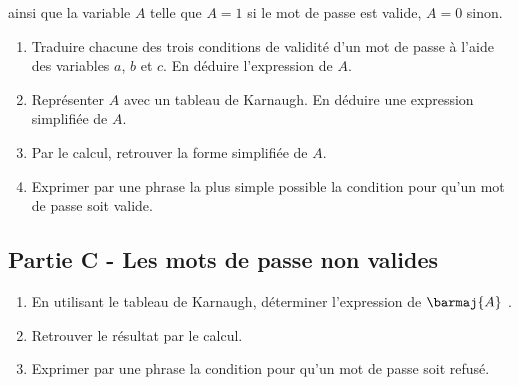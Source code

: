 \documentclass[a4paper,12pt]{article}
\begin{document}
ainsi que la variable $A$ telle que $A = 1$ si le mot de passe est valide, $A = 0$ sinon.

\begin{enumerate}[\bfseries 1.]
    \item 	Traduire chacune des trois conditions de validité d'un mot de passe à l'aide des
    variables $a$, $b$ et $c$. En déduire l'expression de $A$.
   \item 	Représenter $A$ avec un tableau de Karnaugh. En déduire une expression simplifiée
   de $A$.
   \item Par le calcul, retrouver la forme simplifiée de $A$.
   \item Exprimer par une phrase la plus simple possible la condition pour qu'un mot de passe soit valide.
\end{enumerate}
\subsection*{Partie C - Les mots de passe non valides}

\begin{enumerate}[\bfseries 1.]
    \item 	En utilisant le tableau de Karnaugh, déterminer l'expression de $\barmaj{A}$ .
    \item 	Retrouver le résultat par le calcul.
    \item 	Exprimer par une phrase la condition pour qu'un mot de passe soit refusé.
\end{enumerate}
\end{document}
